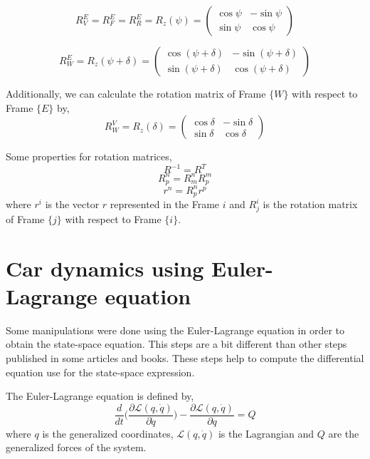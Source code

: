 \documentclass[12pt]{article}
\begin{document}
\begin{equation}
    R_{V}^E = R_{F}^E =R_{R}^E =R_z (\psi) = \begin{pmatrix} \cos{\psi} & - \sin{\psi} \\ \sin{\psi} & \cos{\psi} \end{pmatrix}
\end{equation}

\begin{equation}
    R_{W}^E = R_z (\psi + \delta) = \begin{pmatrix} \cos{(\psi + \delta)} & - \sin{(\psi + \delta)} \\ \sin{(\psi + \delta)} & \cos{(\psi + \delta)} \end{pmatrix}
\end{equation}

Additionally, we can calculate the rotation matrix of Frame $\{ W \}$ with respect to Frame $\{ E \}$ by, 
\begin{equation}
    R_{W}^V =R_z (\delta) = \begin{pmatrix} \cos{\delta} & - \sin{\delta} \\ \sin{\delta} & \cos{\delta} \end{pmatrix}
\end{equation}

Some properties for rotation matrices,
\begin{equation}
R^{-1} = R^T    
\end{equation}
\begin{equation}
R^{n}_{p} = R^{n}_m R^{m}_p     
\end{equation}
\begin{equation}
    r^n = R^n_p r^p
\end{equation}
where $r^i$ is the vector $r$ represented in the Frame ${i}$ and $R^i_j$ is the rotation matrix of Frame $\{ j \}$ with respect to Frame $\{ i \}$.
\section{Car dynamics using Euler-Lagrange equation}
Some manipulations were done using the Euler-Lagrange equation in order to obtain the state-space equation. This steps are a bit different than other steps published in some articles and books. These steps help to compute the differential equation use for the state-space expression.

The Euler-Lagrange equation is defined by,
\begin{equation}
    \frac{d}{dt} \Big( \frac{\partial \mathcal{L}(q,\dot{q})}{\partial \dot{q}} \Big) - \frac{\partial \mathcal{L}(q,\dot{q})}{\partial q} = Q
\end{equation}
where $q$ is the generalized coordinates, $\mathcal{L} (q,\dot{q})$ is the Lagrangian and $Q$ are the generalized forces of the system.
\end{document}
